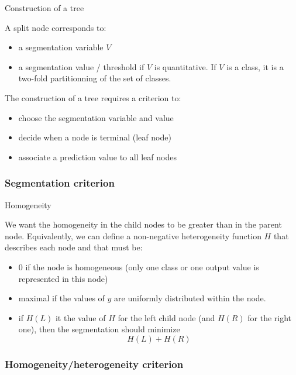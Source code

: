 \documentclass[usenames,dvipsnames]{beamer}
\begin{document}
\begin{frame}{Construction of a tree}
    
    A split node corresponds to:
    \begin{itemize}
        \item a segmentation variable $V$
	\item a segmentation value / threshold if $V$ is quantitative. If $V$ is a class, it is a two-fold partitionning of the set of classes.
    \end{itemize}
   The construction of a tree requires a criterion to:
    \begin{itemize}
        \item choose the segmentation variable and value
	\item decide when a node is terminal (leaf node)
	\item associate a prediction value to all leaf nodes
    \end{itemize}
\end{frame}

\subsubsection{Segmentation criterion}
\label{ssub:segmentation_criterion}

\begin{frame}{Homogeneity}

    We want the homogeneity in the child nodes to be greater than in the parent node. Equivalently, we can define a non-negative heterogeneity function $H$ that describes each node and that must be:
    \begin{itemize}
	\item $0$ if the node is homogeneous (only one class or one output value is represented in this node)
	\item maximal if the values of $y$ are uniformly distributed within the node.
	\item if $H(L)$ it the value of $H$ for the left child node (and $H(R)$ for the right one), then the segmentation should minimize
	    \begin{equation}
		H(L)+H(R)
	    \end{equation}
    \end{itemize}
\end{frame}

\subsubsection{Homogeneity/heterogeneity criterion}%
\label{ssub:homogeneity_criterion}
\end{document}
